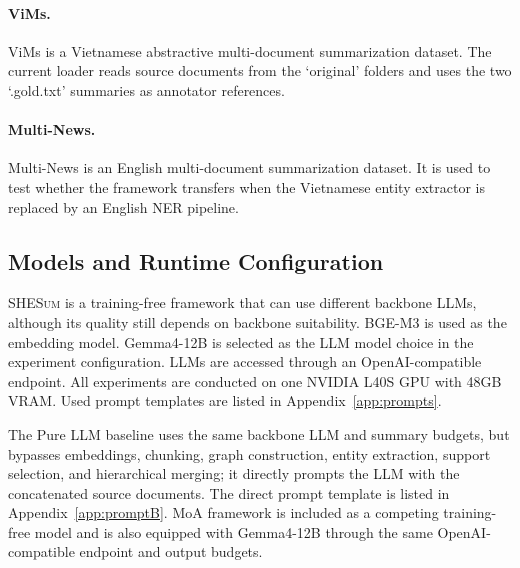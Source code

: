 \documentclass[11pt]{article}
\newcommand{\methodname}{\textsc{SHESum}}
\begin{document}
\paragraph{ViMs.}
ViMs \citep{tran2020vims} is a Vietnamese abstractive multi-document summarization dataset. The current loader reads source documents from the `original' folders and uses the two `.gold.txt' summaries as annotator references.

\paragraph{Multi-News.}
Multi-News \citep{fabbri2019multi} is an English multi-document summarization dataset. It is used to test whether the framework transfers when the Vietnamese entity extractor is replaced by an English NER pipeline. 

\subsection{Models and Runtime Configuration}
\methodname{} is a training-free framework that can use different backbone LLMs, although its quality still depends on backbone suitability. BGE-M3 \citep{bge_m3} is used as the embedding model. Gemma4-12B \citep{gemma4_12b} is selected as the LLM model choice in the experiment configuration. LLMs are accessed through an OpenAI-compatible endpoint. All experiments are conducted on one NVIDIA L40S GPU with 48GB VRAM. Used prompt templates are listed in Appendix~\ref{app:prompts}.

The Pure LLM baseline uses the same backbone LLM and summary budgets, but bypasses embeddings, chunking, graph construction, entity extraction, support selection, and hierarchical merging; it directly prompts the LLM with the concatenated source documents. The direct prompt template is listed in Appendix~\ref{app:promptB}. MoA framework \citep{tuan-2026-moa} is included as a competing training-free model and is also equipped with Gemma4-12B through the same OpenAI-compatible endpoint and output budgets.
\end{document}
